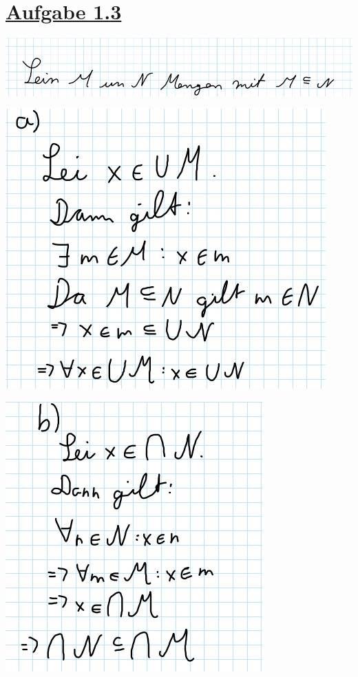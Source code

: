 \section*{\underline{Aufgabe 1.3}}

\includegraphics[width=\textwidth]{part/S1A3intro}

\includegraphics[width=\textwidth]{part/S1A3a}

\includegraphics[width=\textwidth]{part/S1A3b}